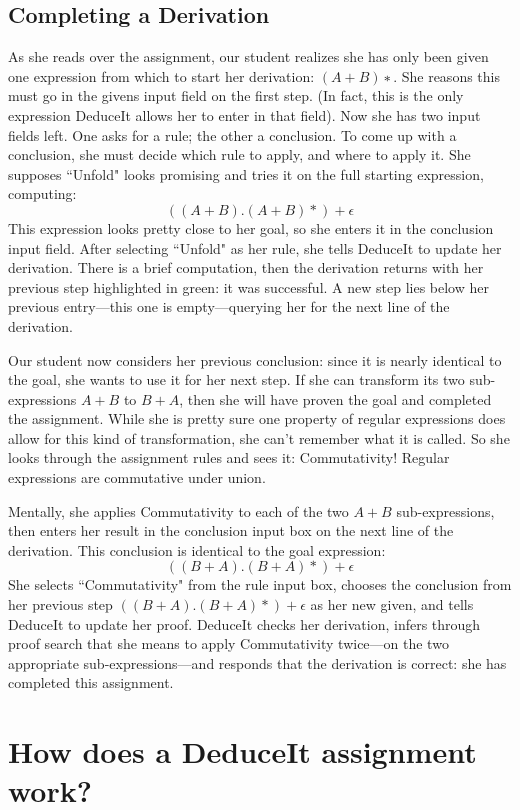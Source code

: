 \documentclass{sigchi}
\begin{document}
\subsection{Completing a Derivation}
As she reads over the assignment, our student realizes she has only been given one expression from which to start her derivation: $(A+B)∗$. She reasons this must go in the givens input field on the first step. (In fact, this is the only expression DeduceIt allows her to enter in that field). Now she has two input fields left. One asks for a rule; the other a conclusion. To come up with a conclusion, she must decide which rule to apply, and where to apply it. She supposes ``Unfold" looks promising and tries it on the full starting expression, computing:
$$((A + B).(A + B)*)+\epsilon$$
This expression looks pretty close to her goal, so she enters it in the conclusion input field. After selecting ``Unfold" as her rule, she tells DeduceIt to update her derivation. There is a brief computation, then the derivation returns with her previous step highlighted in green: it was successful. A new step lies below her previous entry---this one is empty---querying her for the next line of the derivation.

Our student now considers her previous conclusion: since it is nearly identical to the goal, she wants to use it for her next step. If she can transform its two sub-expressions $A+B$ to $B+A$, then she will have proven the goal and completed the assignment. While she is pretty sure one property of regular expressions does allow for this kind of transformation, she can't remember what it is called. So she looks through the assignment rules and sees it: Commutativity! Regular expressions are commutative under union.

Mentally, she applies Commutativity to each of the two $A+B$ sub-expressions, then enters her result in the conclusion input box on the next line of the derivation. This conclusion is identical to the goal expression: 
$$((B+A).(B+A)*)+\epsilon$$
She selects ``Commutativity" from the rule input box, chooses the conclusion from her previous step $((B+A).(B+A)*)+\epsilon$ as her new given, and tells DeduceIt to  update her proof. DeduceIt checks her derivation, infers through proof search that she means to apply Commutativity twice---on the two appropriate sub-expressions---and responds that the derivation is correct: she has completed this assignment.


\section{How does a DeduceIt assignment work?}
\end{document}
